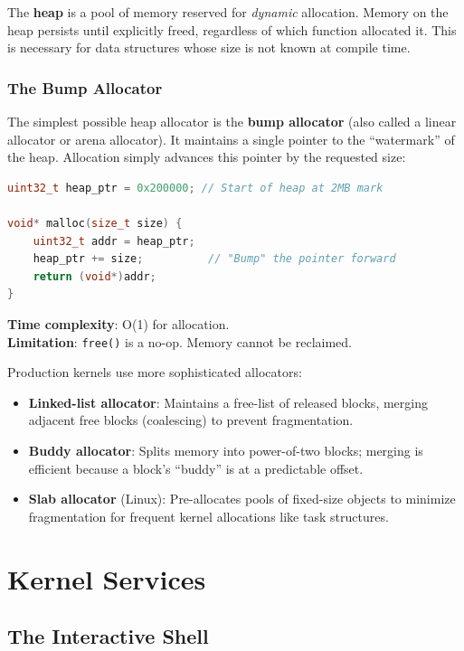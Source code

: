 \documentclass[12pt,a4paper]{report}
\begin{document}
The \textbf{heap} is a pool of memory reserved for \textit{dynamic} allocation. Memory
on the heap persists until explicitly freed, regardless of which function allocated it.
This is necessary for data structures whose size is not known at compile time.

\subsection{The Bump Allocator}

The simplest possible heap allocator is the \textbf{bump allocator} (also called a
linear allocator or arena allocator). It maintains a single pointer to the ``watermark''
of the heap. Allocation simply advances this pointer by the requested size:

\begin{lstlisting}[language=C++, title=kernel/memory.cpp]
uint32_t heap_ptr = 0x200000; // Start of heap at 2MB mark

void* malloc(size_t size) {
    uint32_t addr = heap_ptr;
    heap_ptr += size;          // "Bump" the pointer forward
    return (void*)addr;
}
\end{lstlisting}

\textbf{Time complexity}: O(1) for allocation.\\
\textbf{Limitation}: \texttt{free()} is a no-op. Memory cannot be reclaimed.

Production kernels use more sophisticated allocators:
\begin{itemize}
    \item \textbf{Linked-list allocator}: Maintains a free-list of released blocks,
    merging adjacent free blocks (coalescing) to prevent fragmentation.
    \item \textbf{Buddy allocator}: Splits memory into power-of-two blocks; merging
    is efficient because a block's ``buddy'' is at a predictable offset.
    \item \textbf{Slab allocator} (Linux): Pre-allocates pools of fixed-size objects
    to minimize fragmentation for frequent kernel allocations like task structures.
\end{itemize}

\newpage

\chapter{Kernel Services}

\section{The Interactive Shell}
\end{document}
